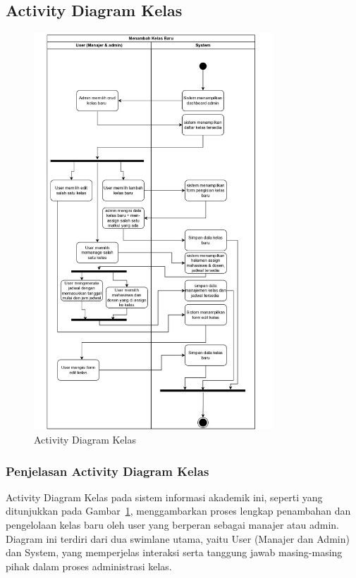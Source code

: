 \documentclass[a4paper,oneside,11pt]{book}
\begin{document}
\subsection{Activity Diagram Kelas}
\begin{figure}[H]
  \centering
  \includegraphics[width=0.8\textwidth]{Activity Diagram/Kelas.jpg}
  \caption{Activity Diagram Kelas}
  \label{fig:activity_kelas}
\end{figure}

\subsubsection{Penjelasan Activity Diagram Kelas}
Activity Diagram Kelas pada sistem informasi akademik ini, seperti yang ditunjukkan pada Gambar~\ref{fig:activity_kelas}, menggambarkan proses lengkap penambahan dan pengelolaan kelas baru oleh user yang berperan sebagai manajer atau admin. Diagram ini terdiri dari dua swimlane utama, yaitu User (Manajer dan Admin) dan System, yang memperjelas interaksi serta tanggung jawab masing-masing pihak dalam proses administrasi kelas.
\end{document}
